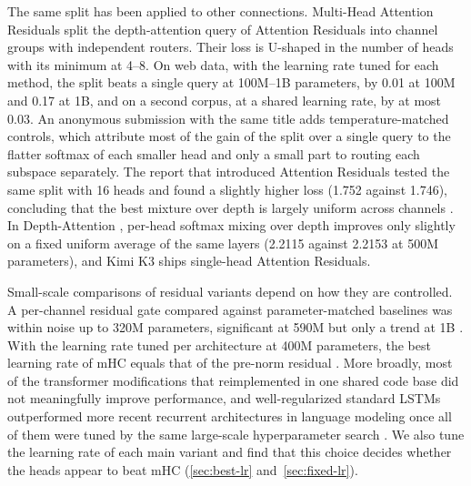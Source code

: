 \documentclass[11pt, a4paper]{article}
\begin{document}
The same split has been applied to other connections. Multi-Head Attention Residuals \citep{luo2026mhar} split the depth-attention
query of Attention Residuals \citep{kimi2026attnres} into channel groups with independent routers. Their loss is U-shaped in the
number of heads with its minimum at 4--8. On web data, with the learning rate tuned for each method, the split beats a single
query at 100M--1B parameters, by 0.01 at 100M and 0.17 at 1B, and on a second corpus, at a shared learning rate, by at most 0.03. An
anonymous submission with the same title \citep{anon2026mharICLR} adds temperature-matched controls, which attribute most of the
gain of the split over a single query to the flatter softmax of each smaller head and only a small part to routing each subspace
separately. The report that introduced Attention Residuals tested the same split with 16 heads and found a slightly higher loss
(1.752 against 1.746), concluding that the best mixture over depth is largely uniform across channels \citep{kimi2026attnres}. In
Depth-Attention \citep{zeng2026depthattention}, per-head softmax mixing over depth improves only slightly on a fixed uniform average of the same layers
(2.2115 against 2.2153 at 500M parameters), and Kimi K3 \citep{kimi2026k3} ships single-head Attention Residuals.

Small-scale comparisons of residual variants depend on how they are controlled. A per-channel residual gate compared against
parameter-matched baselines was within noise up to 320M parameters, significant at 590M but only a trend at 1B
\citep{kramer2026reviewresiduals}. With the learning rate tuned per architecture at 400M parameters, the best learning rate of mHC
equals that of the pre-norm residual \citep{wang2026depthbench}. More broadly, most of the transformer modifications that
\citet{narang2021modifications} reimplemented in one shared code base did not meaningfully improve performance, and
well-regularized standard LSTMs outperformed more recent recurrent architectures in language modeling once all of them were tuned
by the same large-scale hyperparameter search \citep{melis2018evaluation}. We also tune the learning rate of each main variant and find
that this choice decides whether the heads appear to beat mHC (\cref{sec:best-lr} and~\cref{sec:fixed-lr}).
\end{document}
